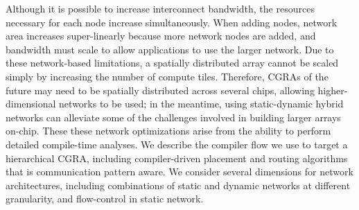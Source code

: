 Although it is possible to increase interconnect bandwidth, the resources necessary for each node increase simultaneously.
When adding nodes, network area increases super-linearly because more network nodes are added, and bandwidth must scale to allow applications to use the larger network.
Due to these network-based limitations, a spatially distributed array cannot be scaled simply by increasing the number of compute tiles.
Therefore, CGRAs of the future may need to be spatially distributed across several chips, allowing
higher-dimensional networks to be used; in the meantime, using static-dynamic hybrid networks can
alleviate some of the challenges involved in building larger arrays on-chip.
These these network optimizations arise from the ability to perform detailed compile-time analyses.
We describe the compiler flow we use to target a hierarchical CGRA, including compiler-driven
placement and routing algorithms that is communication pattern aware.
We consider several dimensions for network architectures, including combinations of static and dynamic
networks at different granularity, and flow-control in static network.

\fi
